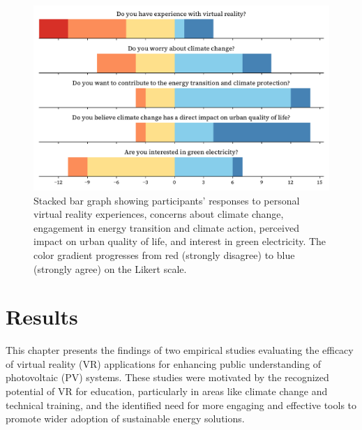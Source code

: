 \documentclass[draft, final]{vutinfth} %
\begin{document}
\begin{figure}[h]
    \centering
    \includegraphics[width=\textwidth]{graphics/participants-solarpowervr.pdf}
    \caption[Participant Responses Summary]{Stacked bar graph showing participants' responses to personal virtual reality experiences, concerns about climate change, engagement in energy transition and climate action, perceived impact on urban quality of life, and interest in green electricity. The color gradient progresses from red (strongly disagree) to blue (strongly agree) on the Likert scale.}
    \label{fig:participants_solarpowervr}
\end{figure}


 
\chapter{Results}


This chapter presents the findings of two empirical studies evaluating the efficacy of virtual reality (VR) applications for enhancing public understanding of photovoltaic (PV) systems.  These studies were motivated by the recognized potential of VR for education, particularly in areas like climate change and technical training, and the identified need for more engaging and effective tools to promote wider adoption of sustainable energy solutions.
\end{document}
